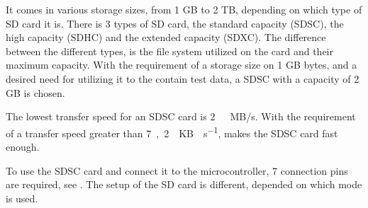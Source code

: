 It comes in various storage sizes, from 1 GB to 2 TB, depending on which type of SD card it is\cite{SDassociation}. There is 3 types of SD card, the standard capacity (SDSC), the high capacity (SDHC) and the extended capacity (SDXC). The difference between the different types, is the file system utilized on the card and their maximum capacity. With the requirement of a storage size on 1 GB bytes, and a desired need for utilizing it to the contain test data, a SDSC with a capacity of 2 GB is chosen.

The lowest transfer speed for an SDSC card is \si{2\ MB/s}\cite{SDassociation}. With the requirement of a transfer speed greater than \si{7,2\ }\si{KB \cdot s^{-1}}, makes the SDSC card fast enough. 

To use the SDSC card and connect it to the microcontroller, 7 connection pins are required, see . The setup of the SD card is different, depended on which mode is used.

